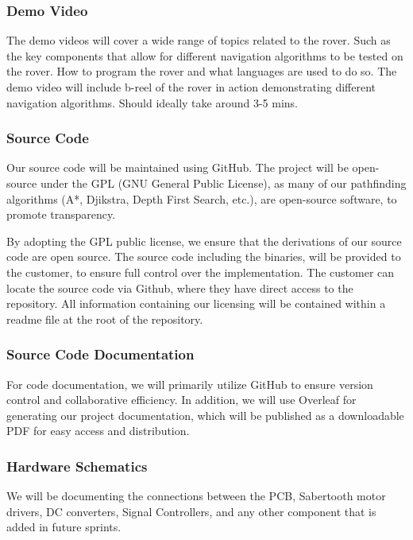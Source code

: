\subsubsection{Demo Video}
The demo videos will cover a wide range of topics related to the rover. Such as the key components that allow for different navigation algorithms to be tested on the rover. How to program the rover and what languages are used to do so. The demo video will include b-reel of the rover in action demonstrating different navigation algorithms. Should ideally take around 3-5 mins.


\subsubsection{Source Code}
Our source code will be maintained using GitHub. The project will be open-source under the GPL (GNU General Public License), as many of our pathfinding algorithms (A*, Djikstra, Depth First Search, etc.), are open-source software, to promote transparency.

By adopting the GPL public license, we ensure that the derivations of our source code are open source. The source code including the binaries, will be provided to the customer, to ensure full control over the implementation. The customer can locate the source code via Github, where they have direct access to the repository.  All information containing our licensing will be contained within a readme file at the root of the repository.

\subsubsection{Source Code Documentation}
For code documentation, we will primarily utilize GitHub to ensure version control and collaborative efficiency. In addition, we will use Overleaf for generating our project documentation, which will be published as a downloadable PDF for easy access and distribution. 

\subsubsection{Hardware Schematics}
We will be documenting the connections between the PCB, Sabertooth motor drivers, DC converters, Signal Controllers, and any other component that is added in future sprints.

